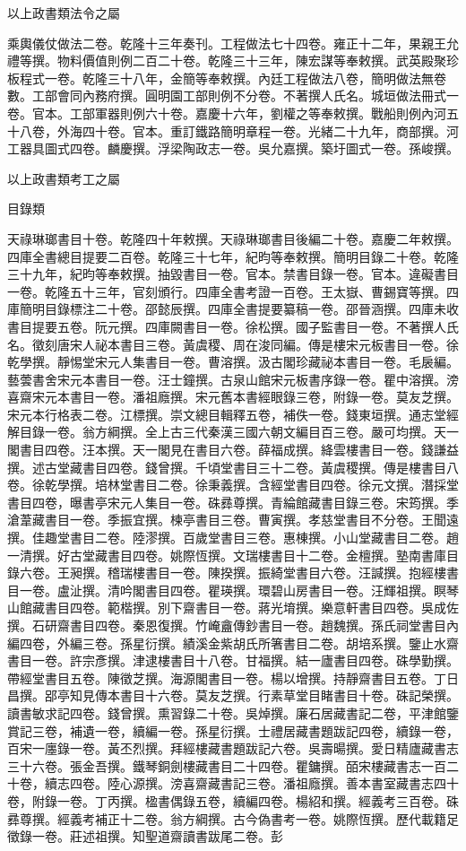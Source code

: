 \begin{pinyinscope}
以上政書類法令之屬

乘輿儀仗做法二卷。乾隆十三年奏刊。工程做法七十四卷。雍正十二年，果親王允禮等撰。物料價值則例二百二十卷。乾隆三十三年，陳宏謀等奉敕撰。武英殿聚珍板程式一卷。乾隆三十八年，金簡等奉敕撰。內廷工程做法八卷，簡明做法無卷數。工部會同內務府撰。圓明園工部則例不分卷。不著撰人氏名。城垣做法冊式一卷。官本。工部軍器則例六十卷。嘉慶十六年，劉權之等奉敕撰。戰船則例內河五十八卷，外海四十卷。官本。重訂鐵路簡明章程一卷。光緒二十九年，商部撰。河工器具圖式四卷。麟慶撰。浮梁陶政志一卷。吳允嘉撰。築圩圖式一卷。孫峻撰。

以上政書類考工之屬

目錄類

天祿琳瑯書目十卷。乾隆四十年敕撰。天祿琳瑯書目後編二十卷。嘉慶二年敕撰。四庫全書總目提要二百卷。乾隆三十七年，紀昀等奉敕撰。簡明目錄二十卷。乾隆三十九年，紀昀等奉敕撰。抽毀書目一卷。官本。禁書目錄一卷。官本。違礙書目一卷。乾隆五十三年，官刻頒行。四庫全書考證一百卷。王太嶽、曹錫寶等撰。四庫簡明目錄標注二十卷。邵懿辰撰。四庫全書提要纂稿一卷。邵晉涵撰。四庫未收書目提要五卷。阮元撰。四庫闕書目一卷。徐松撰。國子監書目一卷。不著撰人氏名。徵刻唐宋人祕本書目三卷。黃虞稷、周在浚同編。傳是樓宋元板書目一卷。徐乾學撰。靜惕堂宋元人集書目一卷。曹溶撰。汲古閣珍藏祕本書目一卷。毛扆編。藝蕓書舍宋元本書目一卷。汪士鐘撰。古泉山館宋元板書序錄一卷。瞿中溶撰。滂喜齋宋元本書目一卷。潘祖廕撰。宋元舊本書經眼錄三卷，附錄一卷。莫友芝撰。宋元本行格表二卷。江標撰。崇文總目輯釋五卷，補佚一卷。錢東垣撰。通志堂經解目錄一卷。翁方綱撰。全上古三代秦漢三國六朝文編目百三卷。嚴可均撰。天一閣書目四卷。汪本撰。天一閣見在書目六卷。薛福成撰。絳雲樓書目一卷。錢謙益撰。述古堂藏書目四卷。錢曾撰。千頃堂書目三十二卷。黃虞稷撰。傳是樓書目八卷。徐乾學撰。培林堂書目二卷。徐秉義撰。含經堂書目四卷。徐元文撰。潛採堂書目四卷，曝書亭宋元人集目一卷。硃彞尊撰。青綸館藏書目錄三卷。宋筠撰。季滄葦藏書目一卷。季振宜撰。楝亭書目三卷。曹寅撰。孝慈堂書目不分卷。王聞遠撰。佳趣堂書目二卷。陸漻撰。百歲堂書目三卷。惠棟撰。小山堂藏書目二卷。趙一清撰。好古堂藏書目四卷。姚際恆撰。文瑞樓書目十二卷。金檀撰。塾南書庫目錄六卷。王昶撰。稽瑞樓書目一卷。陳揆撰。振綺堂書目六卷。汪諴撰。抱經樓書目一卷。盧沚撰。清吟閣書目四卷。瞿瑛撰。環碧山房書目一卷。汪輝祖撰。瞑琴山館藏書目四卷。範楷撰。別下齋書目一卷。蔣光堉撰。樂意軒書目四卷。吳成佐撰。石研齋書目四卷。秦恩復撰。竹崦盦傳鈔書目一卷。趙魏撰。孫氏祠堂書目內編四卷，外編三卷。孫星衍撰。績溪金紫胡氏所箸書目二卷。胡培系撰。鑒止水齋書目一卷。許宗彥撰。津逮樓書目十八卷。甘福撰。結一廬書目四卷。硃學勤撰。帶經堂書目五卷。陳徵芝撰。海源閣書目一卷。楊以增撰。持靜齋書目五卷。丁日昌撰。郘亭知見傳本書目十六卷。莫友芝撰。行素草堂目睹書目十卷。硃記榮撰。讀書敏求記四卷。錢曾撰。熏習錄二十卷。吳焯撰。廉石居藏書記二卷，平津館鑒賞記三卷，補遺一卷，續編一卷。孫星衍撰。士禮居藏書題跋記四卷，續錄一卷，百宋一廛錄一卷。黃丕烈撰。拜經樓藏書題跋記六卷。吳壽暘撰。愛日精廬藏書志三十六卷。張金吾撰。鐵琴銅劍樓藏書目二十四卷。瞿鏞撰。皕宋樓藏書志一百二十卷，續志四卷。陸心源撰。滂喜齋藏書記三卷。潘祖廕撰。善本書室藏書志四十卷，附錄一卷。丁丙撰。楹書偶錄五卷，續編四卷。楊紹和撰。經義考三百卷。硃彞尊撰。經義考補正十二卷。翁方綱撰。古今偽書考一卷。姚際恆撰。歷代載籍足徵錄一卷。莊述祖撰。知聖道齋讀書跋尾二卷。彭
\end{pinyinscope}
